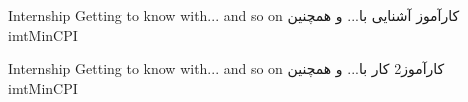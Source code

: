
\jobPositionC
{Internship}
{Getting to know with... and so on}
{کارآموز}
{آشنایی با... و همچنین}
{\parttime}
{}
{}
{imtMinCPI}

\jobPositionC
{Internship}
{Getting to know with... and so on}
{کارآموز2}
{کار با... و همچنین}
{\fulltime}
{}
{}
{imtMinCPI}

